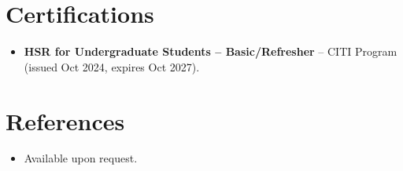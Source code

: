 \documentclass[11pt,a4paper,sans]{moderncv}
\begin{document}

\section{Certifications}
\vspace{1pt}
\begin{itemize}
\item{\textbf{HSR for Undergraduate Students -- Basic/Refresher} -- CITI Program (issued Oct 2024, expires Oct 2027).}
\end{itemize}


\section{References}
\vspace{1pt}
\begin{itemize}
\item{Available upon request.}
\end{itemize}
\end{document}
